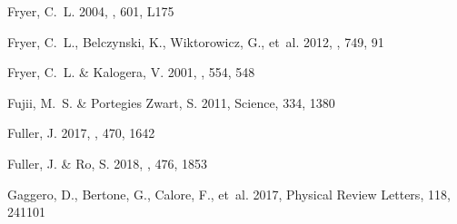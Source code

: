 \documentclass{aa}
\begin{document}
\begin{thebibliography}{242}
{Fryer}, C.~L. 2004, \apjl, 601, L175

{Fryer}, C.~L., {Belczynski}, K., {Wiktorowicz}, G., {et~al.} 2012, \apj, 749,
  91

{Fryer}, C.~L. \& {Kalogera}, V. 2001, \apj, 554, 548

{Fujii}, M.~S. \& {Portegies Zwart}, S. 2011, Science, 334, 1380

{Fuller}, J. 2017, \mnras, 470, 1642

{Fuller}, J. \& {Ro}, S. 2018, \mnras, 476, 1853

{Gaggero}, D., {Bertone}, G., {Calore}, F., {et~al.} 2017, Physical Review
  Letters, 118, 241101


\end{thebibliography}
\end{document}
